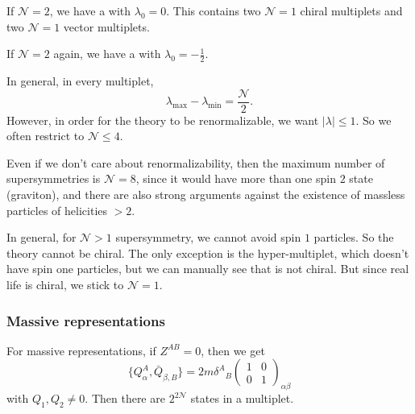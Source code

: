 \documentclass[a4paper]{article}
\begin{document}
\begin{eg}
  If $\mathcal{N} = 2$, we have a  with $\lambda_0 = 0$. This contains two $\mathcal{N} = 1$ chiral multiplets and two $\mathcal{N} = 1$ vector multiplets.
\end{eg}

\begin{eg}
  If $\mathcal{N} = 2$ again, we have a  with $\lambda_0 = -\frac{1}{2}$.
\end{eg}

In general, in every multiplet,
\[
  \lambda_{\mathrm{max}} - \lambda_{\mathrm{min}} = \frac{\mathcal{N}}{2}.
\]
However, in order for the theory to be renormalizable, we want $|\lambda| \leq 1$. So we often restrict to $\mathcal{N} \leq 4$.

Even if we don't care about renormalizability, then the maximum number of supersymmetries is $\mathcal{N} = 8$, since it would have more than one spin $2$ state (graviton), and there are also strong arguments against the existence of massless particles of helicities $> 2$. %

In general, for $\mathcal{N} > 1$ supersymmetry, we cannot avoid spin $1$ particles. So the theory cannot be chiral. The only exception is the hyper-multiplet, which doesn't have spin one particles, but we can manually see that is not chiral. But since real life is chiral, we stick to $\mathcal{N} = 1$.

%

\subsubsection{Massive representations}
For massive representations, if $Z^{AB} = 0$, then we get
\[
  \{Q_\alpha^A, \bar{Q}_{\beta, B}\} = 2m \delta^A\!_B
  \begin{pmatrix}
    1 & 0\\
    0 & 1
  \end{pmatrix}_{\alpha\beta}
\]
with $Q_1, Q_2 \not= 0$. Then there are $2^{2\mathcal{N}}$ states in a multiplet.
\end{document}
